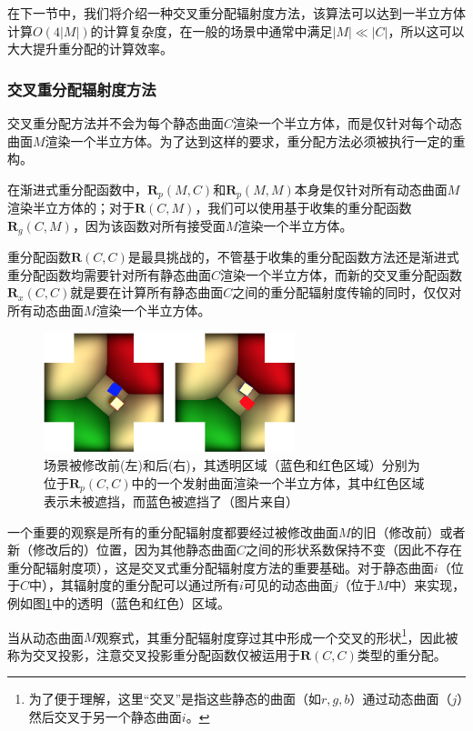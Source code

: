 在下一节中，我们将介绍一种交叉重分配辐射度方法，该算法可以达到一半立方体计算$O(4|M|)$的计算复杂度，在一般的场景中通常中满足$|M|\ll|C|$，所以这可以大大提升重分配的计算效率。




\subsubsection{交叉重分配辐射度方法}
交叉重分配方法并不会为每个静态曲面$C$渲染一个半立方体，而是仅针对每个动态曲面$M$渲染一个半立方体。为了达到这样的要求，重分配方法必须被执行一定的重构。

在渐进式重分配函数中，$\mathbf{R}_p(M,C)$和$\mathbf{R}_p(M,M)$本身是仅针对所有动态曲面$M$渲染半立方体的；对于$\mathbf{R}(C,M)$，我们可以使用基于收集的重分配函数$\mathbf{R}_g(C,M)$，因为该函数对所有接受面$M$渲染一个半立方体。

重分配函数$\mathbf{R}(C,C)$是最具挑战的，不管基于收集的重分配函数方法还是渐进式重分配函数均需要针对所有静态曲面$C$渲染一个半立方体，而新的交叉重分配函数$\mathbf{R}_x(C,C)$就是要在计算所有静态曲面$C$之间的重分配辐射度传输的同时，仅仅对所有动态曲面$M$渲染一个半立方体。

\begin{figure}
	\sidecaption
		\includegraphics[width=0.65\textwidth]{figures/r/path-38}
	\caption{场景被修改前(左)和后(右)，其透明区域（蓝色和红色区域）分别为位于$\mathbf{R}_p(C,C)$中的一个发射曲面渲染一个半立方体，其中红色区域表示未被遮挡，而蓝色被遮挡了（图片来自\cite{a:Real-TimeDynamicRadiosityforHighQualityGlobalIllumination}）}
	\label{f:r-two-hemicubes}
\end{figure}

一个重要的观察是所有的重分配辐射度都要经过被修改曲面$M$的旧（修改前）或者新（修改后的）位置，因为其他静态曲面$C$之间的形状系数保持不变（因此不存在重分配辐射度项），这是交叉式重分配辐射度方法的重要基础。对于静态曲面$i$（位于$C$中），其辐射度的重分配可以通过所有$i$可见的动态曲面$j$（位于$M$中）来实现，例如图\ref{f:r-two-hemicubes}中的透明（蓝色和红色）区域。

当从动态曲面$M$观察式，其重分配辐射度穿过其中形成一个交叉的形状\footnote{为了便于理解，这里“交叉”是指这些静态的曲面（如$r,g,b$）通过动态曲面（$j$）然后交叉于另一个静态曲面$i$。}，因此被称为交叉投影，注意交叉投影重分配函数仅被运用于$\mathbf{R}(C,C)$类型的重分配。

